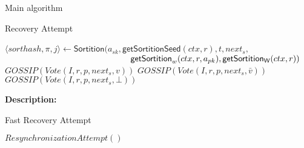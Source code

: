 \documentclass[10pt,a4paper]{article}
\begin{document}
\begin{section}{Main algorithm}
\begin{subsection}{Recovery Attempt}
\begin{algorithm}[H]
\begin{algorithmic}[1]
            \State $\langle sorthash, \pi, j\rangle\gets 
            \mathsf{Sortition}(
            a_{sk}, 
            \mathsf{getSortitionSeed}(ctx, r), 
            t, 
            next_s, $ \newline
            ${}$ ${\hskip 5.2cm}\mathsf{getSortition}_w(ctx, r, a_{pk}), 
            \mathsf{getSortition_W}(ctx, r)
            )$
                    \State $GOSSIP(Vote(I, r, p, next_s, v))$
                    \State $GOSSIP(Vote(I, r, p, next_s, \bar{v}))$
                \Else
                    \State $GOSSIP(Vote(I, r, p, next_s, \bot))$
                \EndIf
            \EndIf    
        \EndFor


        \EndFunction
        \end{algorithmic}
        \caption{\underline{Recovery}}
    \end{algorithm}
    
    
    \noindent \textbf{Description:}\\
    
\end{subsection}


\begin{subsection}{Fast Recovery Attempt}\label{ssect:FastRecovery}

    \begin{algorithm}[H]
        \begin{algorithmic}[1]

        \State $ResynchronizationAttempt()$
    

\end{algorithmic}
\end{algorithm}
\end{subsection}
\end{section}
\end{document}
